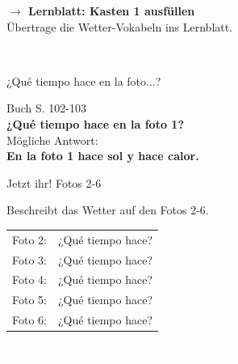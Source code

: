 \documentclass[aspectratio=169,11pt]{beamer}
\newcommand{\es}[1]{\textcolor{spanisch}{\textbf{#1}}}
\newcommand{\phase}[1]{\begin{center}\colorbox{spanisch}{\textcolor{white}{\large\bfseries #1}}\end{center}}
\begin{document}
\begin{frame}{}
\begin{center}
{\Large\bfseries $\rightarrow$ Lernblatt: Kasten 1 ausfüllen}\\[1cm]
{\normalsize Übertrage die Wetter-Vokabeln ins Lernblatt.}
\end{center}
\end{frame}


\begin{frame}{}
\phase{Übung 1: Fotos beschreiben}
\end{frame}

\begin{frame}{¿Qué tiempo hace en la foto...?}
\begin{center}
{\Large Buch S. 102-103}\\[1cm]
{\LARGE \es{¿Qué tiempo hace en la foto 1?}}\\[0.5cm]
\pause
{\Large Mögliche Antwort:}\\
{\Large \es{En la foto 1 hace sol y hace calor.}}
\end{center}
\end{frame}

\begin{frame}{Jetzt ihr! Fotos 2-6}
\begin{center}
{\Large Beschreibt das Wetter auf den Fotos 2-6.}\\[1cm]
\begin{tabular}{ll}
Foto 2: & ¿Qué tiempo hace? \\[0.5em]
Foto 3: & ¿Qué tiempo hace? \\[0.5em]
Foto 4: & ¿Qué tiempo hace? \\[0.5em]
Foto 5: & ¿Qué tiempo hace? \\[0.5em]
Foto 6: & ¿Qué tiempo hace? \\
\end{tabular}
\end{center}
\end{frame}


\begin{frame}{}
\phase{Übung 2: Partner-Interview}
\end{frame}
\end{document}
